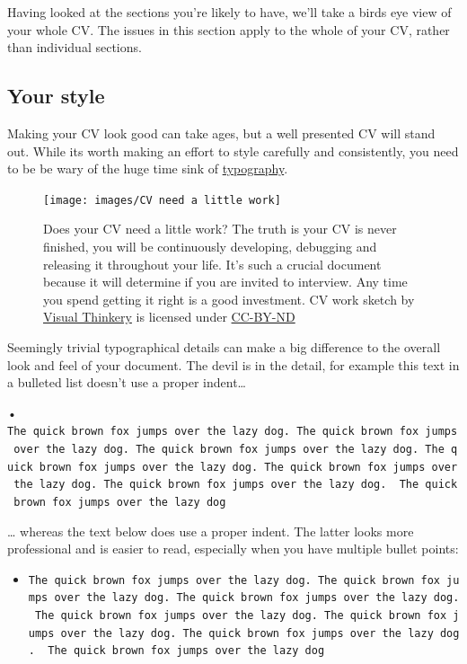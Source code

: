 \documentclass[
]{book}
\providecommand{\tightlist}{%
  \setlength{\itemsep}{0pt}\setlength{\parskip}{0pt}}
\begin{document}
Having looked at the sections you're likely to have, we'll take a birds eye view of your whole CV. The issues in this section apply to the whole of your CV, rather than individual sections.

\hypertarget{pdf}{%
\subsection{Your style}\label{pdf}}

Making your CV look good can take ages, but a well presented CV will stand out. While its worth making an effort to style carefully and consistently, you need to be be wary of the huge time sink of \href{https://en.wikipedia.org/wiki/Typography}{typography}.

\begin{figure}

{\centering \texttt{[image: images/CV need a little work]} 

}

\caption{Does your CV need a little work? The truth is your CV is never finished, you will be continuously developing, debugging and releasing it throughout your life. It's such a crucial document because it will determine if you are invited to interview. Any time you spend getting it right is a good investment. CV work sketch by \href{https://visualthinkery.com}{Visual Thinkery} is licensed under \href{https://creativecommons.org/licenses/by-nd/4.0/}{CC-BY-ND}}\label{fig:cvwork-fig}
\end{figure}



Seemingly trivial typographical details can make a big difference to the overall look and feel of your document. The devil is in the detail, for example this text in a bulleted list doesn't use a proper indent\ldots{}

• \texttt{The\ quick\ brown\ fox\ jumps\ over\ the\ lazy\ dog.\ The\ quick\ brown\ fox\ jumps\ over\ the\ lazy\ dog.\ The\ quick\ brown\ fox\ jumps\ over\ the\ lazy\ dog.\ The\ quick\ brown\ fox\ jumps\ over\ the\ lazy\ dog.\ The\ quick\ brown\ fox\ jumps\ over\ the\ lazy\ dog.\ The\ quick\ brown\ fox\ jumps\ over\ the\ lazy\ dog.\ \ The\ quick\ brown\ fox\ jumps\ over\ the\ lazy\ dog}

\ldots{} whereas the text below does use a proper indent. The latter looks more professional and is easier to read, especially when you have multiple bullet points:

\begin{itemize}
\tightlist
\item
  \texttt{The\ quick\ brown\ fox\ jumps\ over\ the\ lazy\ dog.\ The\ quick\ brown\ fox\ jumps\ over\ the\ lazy\ dog.\ The\ quick\ brown\ fox\ jumps\ over\ the\ lazy\ dog.\ The\ quick\ brown\ fox\ jumps\ over\ the\ lazy\ dog.\ The\ quick\ brown\ fox\ jumps\ over\ the\ lazy\ dog.\ The\ quick\ brown\ fox\ jumps\ over\ the\ lazy\ dog.\ \ The\ quick\ brown\ fox\ jumps\ over\ the\ lazy\ dog}
\end{itemize}
\end{document}
